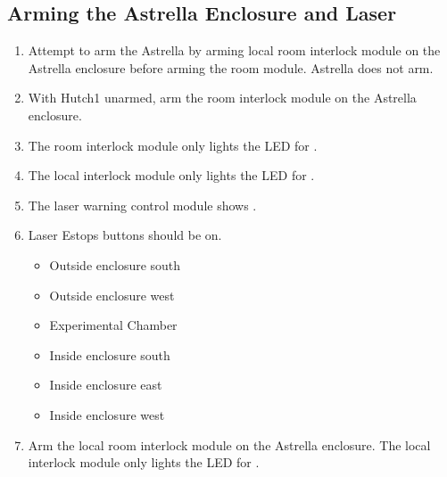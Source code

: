 \documentclass[letterpaper,10pt,english]{sphinxmanual}
\begin{document}
\subsection{Arming the Astrella Enclosure and Laser}
\label{\detokenize{testing_documentation/Hutch-1_laser:arming-the-astrella-enclosure-and-laser}}\begin{enumerate}
%
\item {} 
\sphinxAtStartPar
Attempt to arm the Astrella by arming local room interlock module on the Astrella enclosure before arming the room module.
Astrella does not arm.

\item {} 
\sphinxAtStartPar
With Hutch\sphinxhyphen{}1 unarmed, arm the room interlock module on the Astrella enclosure.

\item {} 
\sphinxAtStartPar
The room interlock module only lights the LED for .

\item {} 
\sphinxAtStartPar
The local interlock module only lights the LED for .

\item {} 
\sphinxAtStartPar
The laser warning control module shows .

\item {} 
\sphinxAtStartPar
Laser E\sphinxhyphen{}stops buttons should be on.
\begin{itemize}
\item {} 
\sphinxAtStartPar
Outside enclosure south

\item {} 
\sphinxAtStartPar
Outside enclosure west

\item {} 
\sphinxAtStartPar
Experimental Chamber

\item {} 
\sphinxAtStartPar
Inside enclosure south

\item {} 
\sphinxAtStartPar
Inside enclosure east

\item {} 
\sphinxAtStartPar
Inside enclosure west

\end{itemize}

\item {} 
\sphinxAtStartPar
Arm the local room interlock module on the Astrella enclosure.
The local interlock module only lights the LED for .


\end{enumerate}
\end{document}
